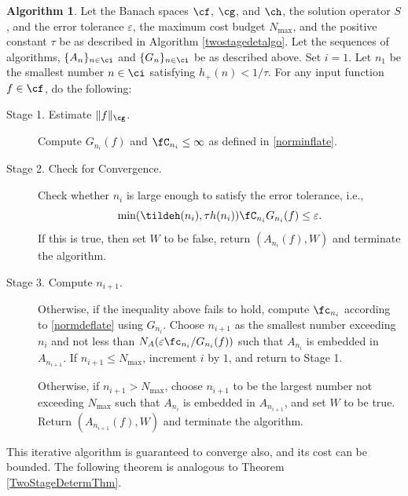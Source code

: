 \documentclass[]{elsarticle}
\theoremstyle{definition}
\newtheorem{algo}{Algorithm}
\theoremstyle{remark}
\begin{document}
\begin{algo} \label{multistagealgo}  Let the Banach spaces $\cf$, $\cg$, and $\ch$, the solution operator $S$, and the error tolerance $\varepsilon$, the maximum cost budget $N_{\max}$, and the positive constant $\tau$ be as described in Algorithm \ref{twostagedetalgo}. Let the sequences of algorithms, $\{A_n\}_{n \in \ci}$ and  $\{G_n\}_{n \in \ci}$ be as described above.  Set $i=1$.  Let $n_1$ be the smallest number $n \in \ci$ satisfying $h_+(n) < 1/\tau$. For any input function $f \in \cf$, do the following:
\begin{description}

\item [Stage 1. Estimate $\| f \| _{\cg}$.] Compute $G_{n_i}(f)$ and $\fC_{n_i} \le \infty$ as defined in \eqref{norminflate}.  

\item [Stage 2. Check for Convergence.] Check whether $n_i$ is large enough to satisfy the error tolerance, i.e., 
\begin{equation} \label{multistageconv}
\min(\tildeh(n_i),\tau h(n_i))\fC_{n_i} G_{n_i}(f) \le \varepsilon.
\end{equation}
If this is true, then set $W$ to be false, return $(A_{n_i}(f),W)$ and terminate the algorithm.

\item[Stage 3. Compute $n_{i+1}$.]  Otherwise, if the inequality above fails to hold, compute $\fc_{n_i}$ according to \eqref{normdeflate} using $G_{n_i}$. Choose $n_{i+1}$ as the smallest number exceeding $n_i$ and not less than $N_{A}(\varepsilon \fc_{n_i}/G_{n_i}(f))$ such that $A_{n_{i}}$ is embedded in $A_{n_{i+1}}$. If $n_{i+1} \le N_{\max}$, increment $i$ by $1$, and return to Stage 1.  

Otherwise, if $n_{i+1} > N_{\max}$, choose $n_{i+1}$ to be the largest number not exceeding $N_{\max}$ such that $A_{n_{i}}$ is embedded in $A_{n_{i+1}}$, and set $W$ to be true. Return $(A_{n_{i+1}}(f),W)$ and terminate the algorithm.
\end{description}  
\end{algo}

This iterative algorithm is guaranteed to converge also, and its cost can be bounded.  The following theorem is analogous to Theorem \ref{TwoStageDetermThm}.
\end{document}
